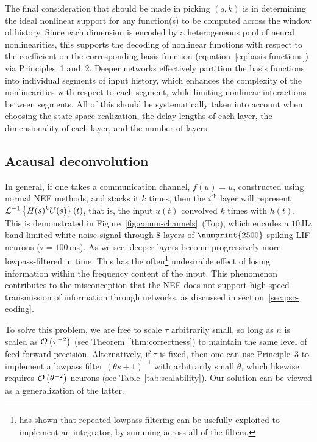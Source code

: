 The final consideration that should be made in picking $(q, k)$ is in determining the ideal nonlinear support for any function(s) to be computed across the window of history.
Since each dimension is encoded by a heterogeneous pool of neural nonlinearities, this supports the decoding of nonlinear functions with respect to the coefficient on the corresponding basis function (equation~\ref{eq:basis-functions}) via Principles~1 and~2.
Deeper networks effectively partition the basis functions into individual segments of input history, which enhances the complexity of the nonlinearities with respect to each segment, while limiting nonlinear interactions between segments.
All of this should be systematically taken into account when choosing the state-space realization, the delay lengths of each layer, the dimensionality of each layer, and the number of layers.

\subsection{Acausal deconvolution}
\label{sec:deconvolution}

In general, if one takes a communication channel, $f(u) = u$, constructed using normal NEF methods, and stacks it $k$ times, then the $i^\text{th}$ layer will represent $\mathcal{L}^{-1}\left\{{ H(s)^k U(s) }\right\}(t)$, that is, the input $u(t)$ convolved $k$ times with $h(t)$.
This is demonstrated in Figure~\ref{fig:comm-channels}~(Top), which encodes a $10$\,Hz band-limited white noise signal through $8$ layers of $\numprint{2500}$ spiking LIF neurons ($\tau = 100$\,ms).
As we see, deeper layers become progressively more lowpass-filtered in time.
This has the often\footnote{%
\citet{goldman2009memory} has shown that repeated lowpass filtering can be usefully exploited to implement an integrator, by summing across all of the filters.
}
undesirable effect of losing information within the frequency content of the input.
This phenomenon contributes to the misconception that the NEF does not support high-speed transmission of information through networks, as discussed in section~\ref{sec:psc-coding}.

To solve this problem, we are free to scale $\tau$ arbitrarily small, so long as $n$ is scaled as $\mathcal{O}\left({\tau^{-2}}\right)$ (see Theorem~\ref{thm:correctness}) to maintain the same level of feed-forward precision.
Alternatively, if $\tau$ is fixed, then one can use Principle~3 to implement a lowpass filter $\left(\theta s + 1\right)^{-1}$ with arbitrarily small $\theta$, which likewise requires $\mathcal{O}\left({\theta^{-2}}\right)$ neurons (see Table~\ref{tab:scalability}).
Our solution can be viewed as a generalization of the latter.

